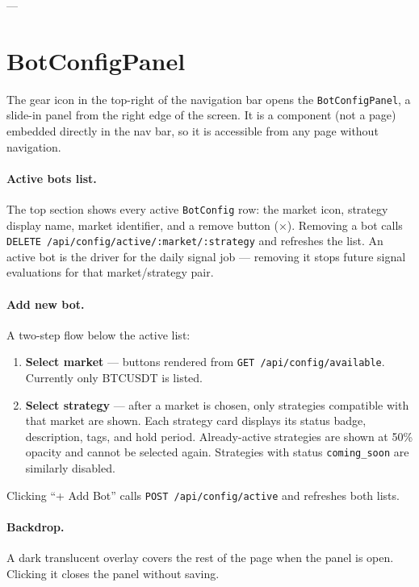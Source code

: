 \documentclass[12pt, a4paper]{article}
\begin{document}
---

\section{BotConfigPanel}
\label{sec:botconfig}

The gear icon in the top-right of the navigation bar opens the
\texttt{BotConfigPanel}, a slide-in panel from the right edge of the screen.
It is a component (not a page) embedded directly in the nav bar, so it is
accessible from any page without navigation.

\paragraph{Active bots list.}
The top section shows every active \texttt{BotConfig} row: the market
icon, strategy display name, market identifier, and a remove button (×).
Removing a bot calls \texttt{DELETE /api/config/active/:market/:strategy}
and refreshes the list. An active bot is the driver for the daily signal
job --- removing it stops future signal evaluations for that
market/strategy pair.

\paragraph{Add new bot.}
A two-step flow below the active list:
\begin{enumerate}[noitemsep]
  \item \textbf{Select market} — buttons rendered from
        \texttt{GET /api/config/available}. Currently only BTCUSDT is listed.
  \item \textbf{Select strategy} — after a market is chosen, only
        strategies compatible with that market are shown. Each strategy card
        displays its status badge, description, tags, and hold period.
        Already-active strategies are shown at 50\% opacity and cannot be
        selected again. Strategies with status \texttt{coming\_soon} are
        similarly disabled.
\end{enumerate}
Clicking ``+ Add Bot'' calls \texttt{POST /api/config/active} and refreshes
both lists.

\paragraph{Backdrop.}
A dark translucent overlay covers the rest of the page when the panel is open.
Clicking it closes the panel without saving.
\end{document}
